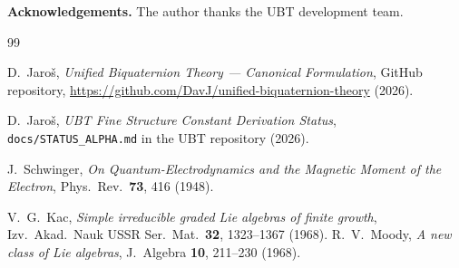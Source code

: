 \documentclass[11pt,a4paper]{article}
\theoremstyle{definition}
\theoremstyle{remark}
\begin{document}
\bigskip
\noindent\textbf{Acknowledgements.} The author thanks the UBT development team.


\begin{thebibliography}{99}

D.\ Jaroš,
\textit{Unified Biquaternion Theory — Canonical Formulation},
GitHub repository, \url{https://github.com/DavJ/unified-biquaternion-theory}
(2026).

D.\ Jaroš,
\textit{UBT Fine Structure Constant Derivation Status},
\texttt{docs/STATUS\_ALPHA.md} in the UBT repository (2026).

J.\ Schwinger,
\textit{On Quantum-Electrodynamics and the Magnetic Moment of the Electron},
Phys.\ Rev.\ \textbf{73}, 416 (1948).

V.\ G.\ Kac,
\textit{Simple irreducible graded Lie algebras of finite growth},
Izv.\ Akad.\ Nauk USSR Ser.\ Mat.\ \textbf{32}, 1323--1367 (1968).
R.\ V.\ Moody,
\textit{A new class of Lie algebras},
J.\ Algebra \textbf{10}, 211--230 (1968).

\end{thebibliography}
\end{document}
